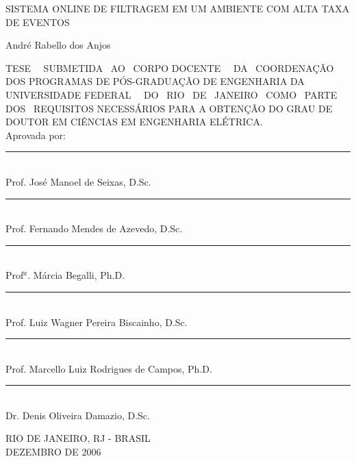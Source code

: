 \begin{titlepage}
\begin{center}
{ SISTEMA ONLINE DE FILTRAGEM EM UM AMBIENTE COM ALTA TAXA DE EVENTOS }

\vspace*{1.0cm}
{André Rabello dos Anjos}
\end{center}
\vspace*{1.0cm}

{ \noindent 
TESE~~ SUBMETIDA~ AO~ CORPO DOCENTE~~ DA~ COORDENAÇÃO~ DOS
PROGRAMAS DE PÓS-GRADUAÇÃO DE ENGENHARIA DA \mbox{UNIVERSIDADE} FEDERAL~~ DO~
RIO~ DE~ JANEIRO~ COMO~ PARTE~ DOS~ REQUISITOS \mbox{NECESSÁRIOS} PARA A
OBTENÇÃO DO GRAU DE DOUTOR EM CIÊNCIAS EM ENGENHARIA ELÉTRICA. }  \\

\noindent Aprovada por:
\vspace{1.0cm} %

\begin{flushright}
\parbox{10cm}
{
\begin{center}

\rule{10cm}{.02cm} \\
Prof. José Manoel de Seixas, D.Sc.
\vspace{.20in}

\rule{10cm}{.02cm} \\
Prof. Fernando Mendes de Azevedo, D.Sc.
\vspace{.20in}

\rule{10cm}{.02cm} \\
Prof$^a$. Márcia Begalli, Ph.D.
\vspace{.20in}

\rule{10cm}{.02cm} \\
Prof. Luiz Wagner Pereira Biscainho, D.Sc.
\vspace{.20in}

\rule{10cm}{.02cm} \\
Prof. Marcello Luiz Rodrigues de Campos, Ph.D.
\vspace{.20in}

\rule{10cm}{.02cm} \\
Dr. Denis Oliveira Damazio, D.Sc.
\vspace{.20in}

\end{center}
}
\end{flushright}
\vspace{-.5cm}

\vfill
\begin{center}
RIO DE JANEIRO, RJ - BRASIL \\
DEZEMBRO DE 2006
\end{center}

\end{titlepage}
